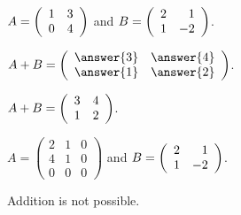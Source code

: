\documentclass{ximera}
\begin{document}
\begin{exercise}\label{c1.1.3d}
  $A=\left(\begin{array}{rr} 1 & 3\\ 0 &4\end{array}\right)$ and $B=\left(\begin{array}{rr} 2 & 1\\ 1 &-2\end{array}\right)$.
  
  \begin{multipleChoice}
  \end{multipleChoice}
  \begin{exercise}
    $A + B = \mattwo{\answer{3}}{\answer{4}}{\answer{1}}{\answer{2}}$.

\begin{solution}
$A + B = \left(\begin{array}{rr} 3 & 4\\ 1 &2\end{array}\right)$.

\end{solution}
  \end{exercise}

\begin{solution}


\end{solution}
\end{exercise}

\begin{exercise}\label{c1.1.3e}
  $A=\left(\begin{array}{rrr} 2 & 1 & 0\\ 4 & 1 & 0\\
             0 & 0 & 0\end{array}\right)$ and $B=\left(\begin{array}{rr} 2 & 1\\ 1 &-2\end{array}\right)$.
         
         \begin{multipleChoice}
         \end{multipleChoice}         

\begin{solution}
Addition is not possible.

\end{solution}
\end{exercise}
\end{document}
